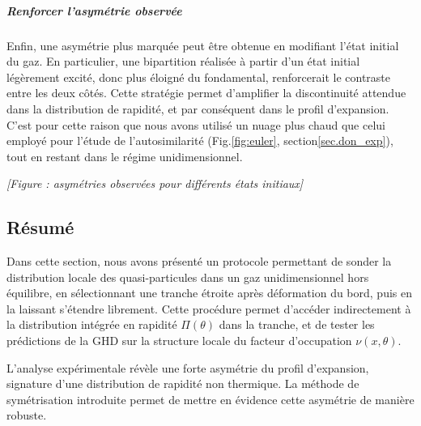\subparagraph{Renforcer l’asymétrie observée}

Enfin, une asymétrie plus marquée peut être obtenue en modifiant l’état initial du gaz. En particulier, une bipartition réalisée à partir d’un état initial légèrement excité, donc plus éloigné du fondamental, renforcerait le contraste entre les deux côtés. Cette stratégie permet d’amplifier la discontinuité attendue dans la distribution de rapidité, et par conséquent dans le profil d’expansion. C’est pour cette raison que nous avons utilisé un nuage plus chaud que celui employé pour l’étude de l’autosimilarité (Fig.\ref{fig:euler}, section\ref{sec.don_exp}), tout en restant dans le régime unidimensionnel.

\vspace{1em}
\begin{center}
\textit{[Figure : asymétries observées pour différents états initiaux]}
\end{center}

\subsection*{Résumé}

Dans cette section, nous avons présenté un protocole permettant de sonder la distribution locale des quasi-particules dans un gaz unidimensionnel hors équilibre, en sélectionnant une tranche étroite après déformation du bord, puis en la laissant s’étendre librement. Cette procédure permet d’accéder indirectement à la distribution intégrée en rapidité $\Pi(\theta)$ dans la tranche, et de tester les prédictions de la GHD sur la structure locale du facteur d’occupation $\nu(x,\theta)$.

\medskip

L’analyse expérimentale révèle une forte asymétrie du profil d’expansion, signature d’une distribution de rapidité non thermique. La méthode de symétrisation introduite permet de mettre en évidence cette asymétrie de manière robuste.%


